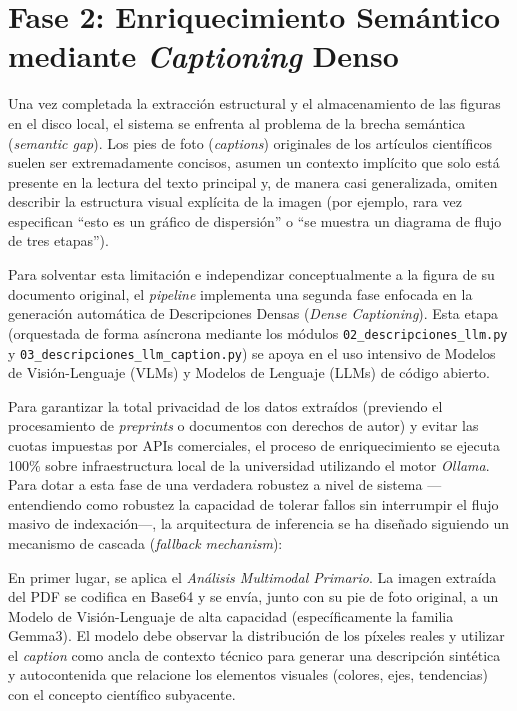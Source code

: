 \documentclass[a4paper]{report}
\begin{document}
\section{Fase 2: Enriquecimiento Semántico mediante \textit{Captioning} Denso}
\label{sec:metodologia_captioning}
\endgroup

Una vez completada la extracción estructural y el almacenamiento de las figuras en el disco local, el sistema se enfrenta al problema de la brecha semántica (\textit{semantic gap}). Los pies de foto (\textit{captions}) originales de los artículos científicos suelen ser extremadamente concisos, asumen un contexto implícito que solo está presente en la lectura del texto principal y, de manera casi generalizada, omiten describir la estructura visual explícita de la imagen (por ejemplo, rara vez especifican ``esto es un gráfico de dispersión'' o ``se muestra un diagrama de flujo de tres etapas''). 

Para solventar esta limitación e independizar conceptualmente a la figura de su documento original, el \textit{pipeline} implementa una segunda fase enfocada en la generación automática de Descripciones Densas (\textit{Dense Captioning}). Esta etapa (orquestada de forma asíncrona mediante los módulos \texttt{02\_descripciones\_llm.py} y \texttt{03\_descripciones\_llm\_caption.py}) se apoya en el uso intensivo de Modelos de Visión-Lenguaje (VLMs) y Modelos de Lenguaje (LLMs) de código abierto.

Para garantizar la total privacidad de los datos extraídos (previendo el procesamiento de \textit{preprints} o documentos con derechos de autor) y evitar las cuotas impuestas por APIs comerciales, el proceso de enriquecimiento se ejecuta 100\% sobre infraestructura local de la universidad utilizando el motor \textit{Ollama}. Para dotar a esta fase de una verdadera robustez a nivel de sistema —entendiendo como robustez la capacidad de tolerar fallos sin interrumpir el flujo masivo de indexación—, la arquitectura de inferencia se ha diseñado siguiendo un mecanismo de cascada (\textit{fallback mechanism}):

En primer lugar, se aplica el \textit{Análisis Multimodal Primario}. La imagen extraída del PDF se codifica en Base64 y se envía, junto con su pie de foto original, a un Modelo de Visión-Lenguaje de alta capacidad (específicamente la familia Gemma3). El modelo debe observar la distribución de los píxeles reales y utilizar el \textit{caption} como ancla de contexto técnico para generar una descripción sintética y autocontenida que relacione los elementos visuales (colores, ejes, tendencias) con el concepto científico subyacente.
\end{document}
